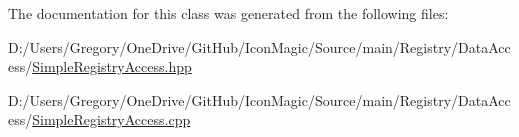The documentation for this class was generated from the following files\+:\begin{DoxyCompactItemize}
\item 
D\+:/\+Users/\+Gregory/\+One\+Drive/\+Git\+Hub/\+Icon\+Magic/\+Source/main/\+Registry/\+Data\+Access/\hyperlink{_simple_registry_access_8hpp}{Simple\+Registry\+Access.\+hpp}\item 
D\+:/\+Users/\+Gregory/\+One\+Drive/\+Git\+Hub/\+Icon\+Magic/\+Source/main/\+Registry/\+Data\+Access/\hyperlink{_simple_registry_access_8cpp}{Simple\+Registry\+Access.\+cpp}\end{DoxyCompactItemize}
